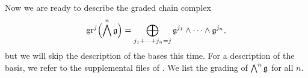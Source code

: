 
Now we are ready to describe the graded chain complex
\begin{equation*}
  \operatorname{gr}^{j}\Bigl( \bigwedge^{n}\mathfrak{g} \Bigr) = \bigoplus_{j_{1} + \dotsb + j_{n} = j} \mathfrak{g}^{j_{1}} \wedge \dotsb \wedge \mathfrak{g}^{j_{n}},
\end{equation*}
but we will skip the description of the bases this time. For a description of the basis, we refer to the supplemental files of \cite{code}. We list the grading of $\bigwedge^{n}\mathfrak{g}$ for all $n$.

